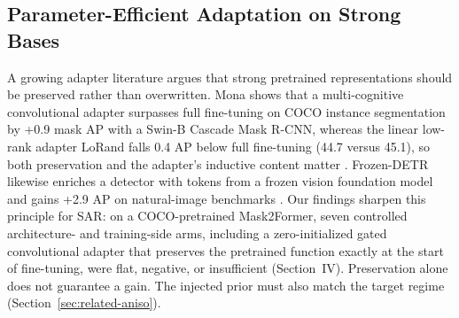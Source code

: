 \subsection{Parameter-Efficient Adaptation on Strong Bases}
\label{sec:related-peft}
A growing adapter literature argues that strong pretrained representations should be preserved rather than overwritten. Mona shows that a multi-cognitive convolutional adapter surpasses full fine-tuning on COCO instance segmentation by +0.9 mask AP with a Swin-B Cascade Mask R-CNN, whereas the linear low-rank adapter LoRand falls 0.4 AP below full fine-tuning (44.7 versus 45.1), so both preservation and the adapter's inductive content matter \cite{mona2025}. Frozen-DETR likewise enriches a detector with tokens from a frozen vision foundation model and gains +2.9 AP on natural-image benchmarks \cite{frozendetr2024}. Our findings sharpen this principle for SAR: on a COCO-pretrained Mask2Former, seven controlled architecture- and training-side arms, including a zero-initialized gated convolutional adapter that preserves the pretrained function exactly at the start of fine-tuning, were flat, negative, or insufficient (Section~IV). Preservation alone does not guarantee a gain. The injected prior must also match the target regime (Section~\ref{sec:related-aniso}).

